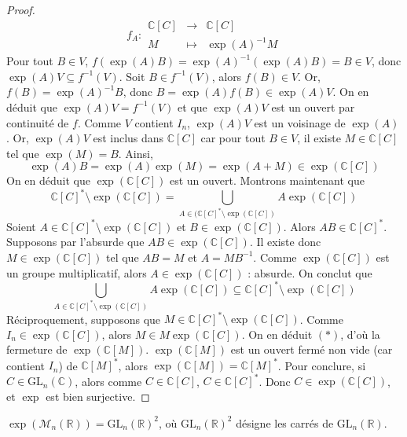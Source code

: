 \begin{proof}
    \[
      f_A :
      \begin{array}{ccc}
        \mathbb{C}[C] &\rightarrow& \mathbb{C}[C] \\
        M &\mapsto& \exp(A)^{-1}M
      \end{array}
    \]
    Pour tout $B \in V$, $f(\exp(A)B) = \exp(A)^{-1}(\exp(A)B) = B \in V$, donc $\exp(A)V \subseteq f^{-1}(V)$. Soit $B \in f^{-1}(V)$, alors $f(B) \in V$. Or, $f(B) = \exp(A)^{-1}B$, donc $B = \exp(A)f(B) \in \exp(A)V$. On en déduit que $\exp(A)V = f^{-1}(V)$ et que $\exp(A)V$ est un ouvert par continuité de $f$. Comme $V$ contient $I_n$, $\exp(A)V$ est un voisinage de $\exp(A)$. Or, $\exp(A)V$ est inclus dans $\mathbb{C}[C]$ car pour tout $B \in V$, il existe $M \in \mathbb{C}[C]$ tel que $\exp(M)=B$. Ainsi,
    \[ \exp(A)B = \exp(A)\exp(M) = \exp(A+M) \in \exp(\mathbb{C}[C]) \]
    On en déduit que $\exp(\mathbb{C}[C])$ est un ouvert.
    \newpar
    Montrons maintenant que
    \[ \mathbb{C}[C]^* \setminus \exp(\mathbb{C}[C]) = \bigcup_{A \in (\mathbb{C}[C]^* \setminus \exp(\mathbb{C}[C])} A\exp(\mathbb{C}[C]) \tag{$(*)$} \]
    Soient $A \in \mathbb{C}[C]^* \setminus \exp(\mathbb{C}[C])$ et $B \in \exp(\mathbb{C}[C])$. Alors $AB \in \mathbb{C}[C]^*$. Supposons par l'absurde que $AB \in \exp(\mathbb{C}[C])$. Il existe donc $M \in \exp(\mathbb{C}[C])$ tel que $AB = M$ et $A=MB^{-1}$. Comme $\exp(\mathbb{C}[C])$ est un groupe multiplicatif, alors $A \in \exp(\mathbb{C}[C])$ : absurde. On conclut que
    \[ \bigcup_{A \in \mathbb{C}[C]^* \setminus \exp(\mathbb{C}[C])} A\exp(\mathbb{C}[C]) \subseteq \mathbb{C}[C]^* \setminus \exp(\mathbb{C}[C]) \]
    Réciproquement, supposons que $M \in \mathbb{C}[C]^* \setminus \exp(\mathbb{C}[C])$. Comme $I_n \in \exp(\mathbb{C}[C])$, alors $M \in M\exp(\mathbb{C}[C])$. On en déduit $(*)$, d'où la fermeture de $\exp(\mathbb{C}[M])$.
    \newpar
    $\exp(\mathbb{C}[M])$ est un ouvert fermé non vide (car contient $I_n$) de $\mathbb{C}[M]^*$, alors $\exp(\mathbb{C}[M]) = \mathbb{C}[M]^*$. Pour conclure, si $C \in \mathrm{GL}_n(\mathbb{C})$, alors comme $C \in \mathbb{C}[C]$, $C \in \mathbb{C}[C]^*$. Donc $C \in \exp(\mathbb{C}[C])$, et $\exp$ est bien surjective.
  \end{proof}

  \begin{application}
    $\exp(\mathcal{M}_n(\mathbb{R})) = \mathrm{GL}_n(\mathbb{R})^2$, où $\mathrm{GL}_n(\mathbb{R})^2$ désigne les carrés de $\mathrm{GL}_n(\mathbb{R})$.
  \end{application}

